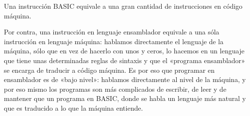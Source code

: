 \documentclass[letterpaper,10pt,spanish]{sphinxmanual}
\begin{document}
Una instrucción BASIC equivale a una gran cantidad de instrucciones en código máquina.

Por contra, una instrucción en lenguaje ensamblador equivale a una sóla instrucción en lenguaje máquina: hablamos directamente el lenguaje de la máquina, sólo que en vez de hacerlo con unos y ceros, lo hacemos en un lenguaje que tiene unas determinadas reglas de sintaxis y que el «programa ensamblador» se encarga de traducir a código máquina. Es por eso que programar en ensamblador es de «bajo nivel»: hablamos directamente al nivel de la máquina, y por eso mismo los programas son más complicados de escribir, de leer y de mantener que un programa en BASIC, donde se habla un lenguaje más natural y que es traducido a lo que la máquina entiende.

\begin{sphinxVerbatim}[commandchars=\\\{\}]

                         
                       
            
             
            
                   
                            


                          
\end{sphinxVerbatim}
\end{document}
